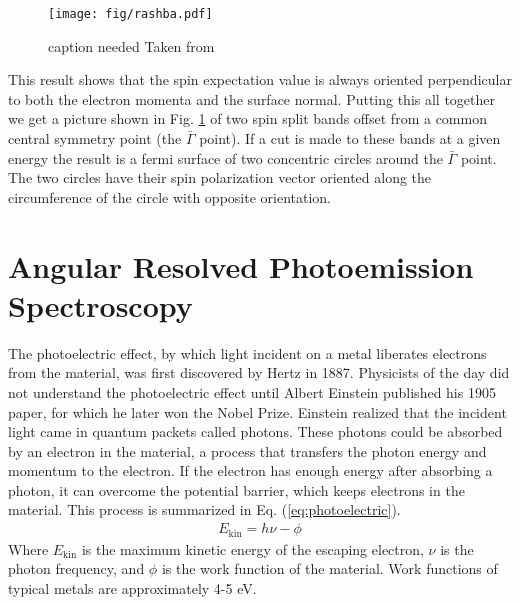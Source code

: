 \documentclass[12pt]{article}
\begin{document}
\begin{figure}[th]
  \centering
  \texttt{[image: fig/rashba.pdf]}
  \caption[should I put this here?]
  {caption needed Taken from \cite{Dil}}
  \label{fig:rashba}
\end{figure}
This result shows that the spin expectation value is always oriented perpendicular to both the electron momenta and the surface normal.
Putting this all together we get a picture shown in Fig. \ref{fig:rashba} of two spin split bands offset from a common central symmetry point (the $\bar{\Gamma}$ point).
If a cut is made to these bands at a given energy the result is a fermi surface of two concentric circles around the $\bar{\Gamma}$ point.
The two circles have their spin polarization vector oriented along the circumference of the circle with opposite orientation.

\section{Angular Resolved Photoemission Spectroscopy}
The photoelectric effect, by which light incident on a metal liberates electrons from the material, was first discovered by Hertz in 1887.
Physicists of the day did not understand the photoelectric effect until Albert Einstein published his 1905 paper, for which he later won the Nobel Prize.
Einstein realized that the incident light came in quantum packets called photons.
These photons could be absorbed by an electron in the material, a process that transfers the photon energy and momentum to the electron.
If the electron has enough energy after absorbing a photon, it can overcome the potential barrier, which keeps electrons in the material.
This process is summarized in Eq. (\ref{eq:photoelectric}).
\begin{align}
  \label{eq:photoelectric}
  E_{\text{kin}}=h\nu-\phi
\end{align}
Where $E_{\text{kin}}$ is the maximum kinetic energy of the escaping electron, $\nu$ is the photon frequency, and $\phi$ is the work function of the material.
Work functions of typical metals are approximately 4-5 eV.
\end{document}
